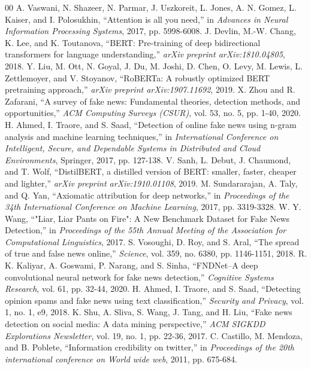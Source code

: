 \documentclass[conference]{IEEEtran}
\begin{document}
\begin{thebibliography}{00}
 A. Vaswani, N. Shazeer, N. Parmar, J. Uszkoreit, L. Jones, A. N. Gomez, L. Kaiser, and I. Polosukhin, ``Attention is all you need,'' in \textit{Advances in Neural Information Processing Systems}, 2017, pp. 5998-6008.
 J. Devlin, M.-W. Chang, K. Lee, and K. Toutanova, ``BERT: Pre-training of deep bidirectional transformers for language understanding,'' \textit{arXiv preprint arXiv:1810.04805}, 2018.
 Y. Liu, M. Ott, N. Goyal, J. Du, M. Joshi, D. Chen, O. Levy, M. Lewis, L. Zettlemoyer, and V. Stoyanov, ``RoBERTa: A robustly optimized BERT pretraining approach,'' \textit{arXiv preprint arXiv:1907.11692}, 2019.
 X. Zhou and R. Zafarani, ``A survey of fake news: Fundamental theories, detection methods, and opportunities,'' \textit{ACM Computing Surveys (CSUR)}, vol. 53, no. 5, pp. 1-40, 2020.
 H. Ahmed, I. Traore, and S. Saad, ``Detection of online fake news using n-gram analysis and machine learning techniques,'' in \textit{International Conference on Intelligent, Secure, and Dependable Systems in Distributed and Cloud Environments}, Springer, 2017, pp. 127-138.
 V. Sanh, L. Debut, J. Chaumond, and T. Wolf, ``DistilBERT, a distilled version of BERT: smaller, faster, cheaper and lighter,'' \textit{arXiv preprint arXiv:1910.01108}, 2019.
 M. Sundararajan, A. Taly, and Q. Yan, ``Axiomatic attribution for deep networks,'' in \textit{Proceedings of the 34th International Conference on Machine Learning}, 2017, pp. 3319-3328.
 W. Y. Wang, ``"Liar, Liar Pants on Fire": A New Benchmark Dataset for Fake News Detection,'' in \textit{Proceedings of the 55th Annual Meeting of the Association for Computational Linguistics}, 2017.
 S. Vosoughi, D. Roy, and S. Aral, ``The spread of true and false news online,'' \textit{Science}, vol. 359, no. 6380, pp. 1146-1151, 2018.
 R. K. Kaliyar, A. Goswami, P. Narang, and S. Sinha, ``FNDNet--A deep convolutional neural network for fake news detection,'' \textit{Cognitive Systems Research}, vol. 61, pp. 32-44, 2020.
 H. Ahmed, I. Traore, and S. Saad, ``Detecting opinion spams and fake news using text classification,'' \textit{Security and Privacy}, vol. 1, no. 1, e9, 2018.
 K. Shu, A. Sliva, S. Wang, J. Tang, and H. Liu, ``Fake news detection on social media: A data mining perspective,'' \textit{ACM SIGKDD Explorations Newsletter}, vol. 19, no. 1, pp. 22-36, 2017.
 C. Castillo, M. Mendoza, and B. Poblete, ``Information credibility on twitter,'' in \textit{Proceedings of the 20th international conference on World wide web}, 2011, pp. 675-684.

\end{thebibliography}
\end{document}
